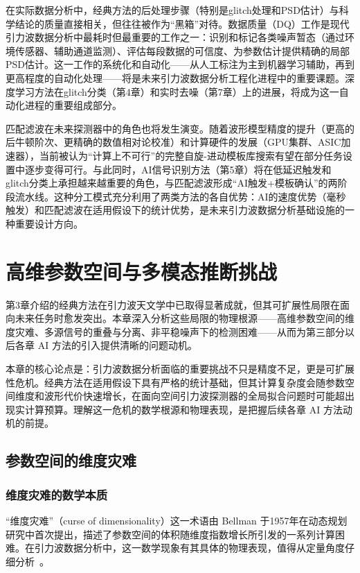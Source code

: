 在实际数据分析中，经典方法的后处理步骤（特别是glitch处理和PSD估计）与科学结论的质量直接相关，但往往被作为“黑箱”对待。数据质量（DQ）工作是现代引力波数据分析中最耗时但最重要的工作之一：识别和标记各类噪声暂态（通过环境传感器、辅助通道监测）、评估每段数据的可信度、为参数估计提供精确的局部PSD估计。这一工作的系统化和自动化——从人工标注为主到机器学习辅助，再到更高程度的自动化处理——将是未来引力波数据分析工程化进程中的重要课题。深度学习方法在glitch分类（第4章）和实时去噪（第7章）上的进展，将成为这一自动化进程的重要组成部分。

匹配滤波在未来探测器中的角色也将发生演变。随着波形模型精度的提升（更高的后牛顿阶次、更精确的数值相对论校准）和计算硬件的发展（GPU集群、ASIC加速器），当前被认为“计算上不可行”的完整自旋-进动模板库搜索有望在部分任务设置中逐步变得可行。与此同时，AI信号识别方法（第5章）将在低延迟触发和glitch分类上承担越来越重要的角色，与匹配滤波形成“AI触发+模板确认”的两阶段流水线。这种分工模式充分利用了两类方法的各自优势：AI的速度优势（毫秒触发）和匹配滤波在适用假设下的统计优势，是未来引力波数据分析基础设施的一种重要设计方向。

\chapter{高维参数空间与多模态推断挑战}

第3章介绍的经典方法在引力波天文学中已取得显著成就，但其可扩展性局限在面向未来任务时愈发突出。本章深入分析这些局限的物理根源——高维参数空间的维度灾难、多源信号的重叠与分离、非平稳噪声下的检测困难——从而为第三部分以后各章 AI 方法的引入提供清晰的问题动机。

本章的核心论点是：引力波数据分析面临的重要挑战不只是精度不足，更是可扩展性危机。经典方法在适用假设下具有严格的统计基础，但其计算复杂度会随参数空间维度和波形代价快速增长，在面向空间引力波探测器的全局拟合问题时可能超出现实计算预算。理解这一危机的数学根源和物理表现，是把握后续各章 AI 方法动机的前提。

\section{参数空间的维度灾难}

\subsection{维度灾难的数学本质}

“维度灾难”（curse of dimensionality）这一术语由 Bellman 于1957年在动态规划研究中首次提出，描述了参数空间的体积随维度指数增长所引发的一系列计算困难。在引力波数据分析中，这一数学现象有其具体的物理表现，值得从定量角度仔细分析~\cite{Christensen2022noise}。

